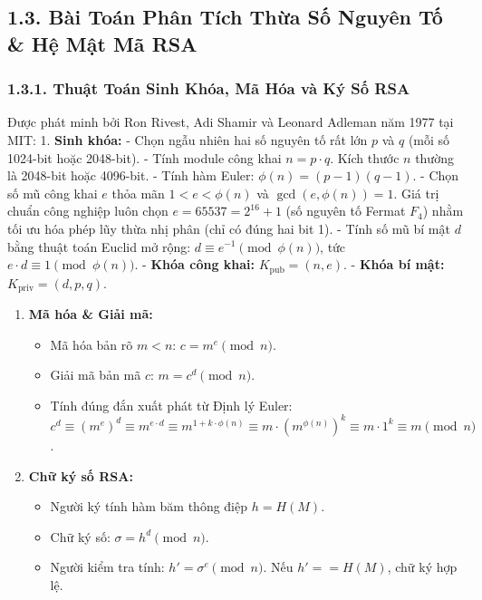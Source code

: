 \documentclass[
]{article}
\providecommand{\tightlist}{%
  \setlength{\itemsep}{0pt}\setlength{\parskip}{0pt}}
\begin{document}
\subsection{1.3. Bài Toán Phân Tích Thừa Số Nguyên Tố \& Hệ Mật Mã
RSA}\label{buxe0i-touxe1n-phuxe2n-tuxedch-thux1eeba-sux1ed1-nguyuxean-tux1ed1-hux1ec7-mux1eadt-muxe3-rsa}

\subsubsection{1.3.1. Thuật Toán Sinh Khóa, Mã Hóa và Ký Số
RSA}\label{thuux1eadt-touxe1n-sinh-khuxf3a-muxe3-huxf3a-vuxe0-kuxfd-sux1ed1-rsa}

Được phát minh bởi Ron Rivest, Adi Shamir và Leonard Adleman năm 1977
tại MIT: 1. \textbf{Sinh khóa:} - Chọn ngẫu nhiên hai số nguyên tố rất
lớn \(p\) và \(q\) (mỗi số 1024-bit hoặc 2048-bit). - Tính module công
khai \(n = p \cdot q\). Kích thước \(n\) thường là 2048-bit hoặc
4096-bit. - Tính hàm Euler: \(\phi(n) = (p - 1)(q - 1)\). - Chọn số mũ
công khai \(e\) thỏa mãn \(1 < e < \phi(n)\) và
\(\gcd(e, \phi(n)) = 1\). Giá trị chuẩn công nghiệp luôn chọn
\(e = 65537 = 2^{16} + 1\) (số nguyên tố Fermat \(F_4\)) nhằm tối ưu hóa
phép lũy thừa nhị phân (chỉ có đúng hai bit 1). - Tính số mũ bí mật
\(d\) bằng thuật toán Euclid mở rộng:
\(d \equiv e^{-1} \pmod{\phi(n)}\), tức
\(e \cdot d \equiv 1 \pmod{\phi(n)}\). - \textbf{Khóa công khai:}
\(K_{\text{pub}} = (n, e)\). - \textbf{Khóa bí mật:}
\(K_{\text{priv}} = (d, p, q)\).

\begin{enumerate}
\def\labelenumi{\arabic{enumi}.}
\setcounter{enumi}{1}
\tightlist
\item
  \textbf{Mã hóa \& Giải mã:}

  \begin{itemize}
  \tightlist
  \item
    Mã hóa bản rõ \(m < n\): \(c = m^e \pmod n\).
  \item
    Giải mã bản mã \(c\): \(m = c^d \pmod n\).
  \item
    Tính đúng đắn xuất phát từ Định lý Euler:
    \(c^d \equiv (m^e)^d \equiv m^{e \cdot d} \equiv m^{1 + k \cdot \phi(n)} \equiv m \cdot (m^{\phi(n)})^k \equiv m \cdot 1^k \equiv m \pmod n\).
  \end{itemize}
\item
  \textbf{Chữ ký số RSA:}

  \begin{itemize}
  \tightlist
  \item
    Người ký tính hàm băm thông điệp \(h = H(M)\).
  \item
    Chữ ký số: \(\sigma = h^d \pmod n\).
  \item
    Người kiểm tra tính: \(h' = \sigma^e \pmod n\). Nếu \(h' == H(M)\),
    chữ ký hợp lệ.
  \end{itemize}
\end{enumerate}
\end{document}
